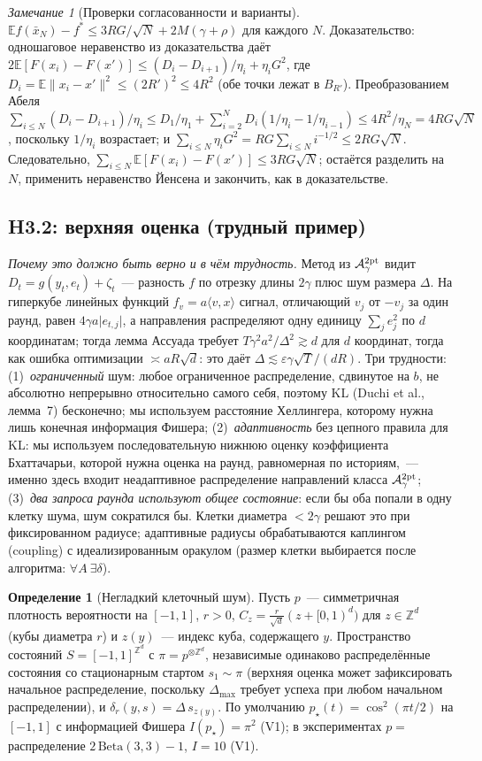 \documentclass[11pt,a4paper]{article}
\numberwithin{equation}{section}
\theoremstyle{definition}
\newtheorem{definition}[theorem]{Определение}
\theoremstyle{remark}
\newtheorem{remark}[theorem]{Замечание}
\newcommand{\E}{\mathbb E}\newcommand{\R}{\mathbb R}\newcommand{\Z}{\mathbb Z}\let\Prob\relax\newcommand{\Prob}{\mathbb P}
\newcommand{\norm}[1]{\lVert #1\rVert}\newcommand{\abs}[1]{\lvert #1\rvert}\newcommand{\ip}[2]{\langle #1,#2\rangle}
\newcommand{\Dmax}{\Delta_{\max}}\newcommand{\Dcp}{\Delta_{\rm cp}}\newcommand{\Dlow}{\Delta_{\rm low}}
\begin{document}
\begin{remark}[Проверки согласованности и варианты]
$\E f(\bar x_N)-f^*\le3RG/\sqrt N+2M(\gamma+\rho)$ для каждого $N$. Доказательство: одношаговое неравенство из доказательства даёт $2\E[F(x_i)-F(x')]\le(D_i-D_{i+1})/\eta_i+\eta_iG^2$, где $D_i=\E\norm{x_i-x'}^2\le(2R')^2\le4R^2$ (обе точки лежат в $B_{R'}$). Преобразованием Абеля $\sum_{i\le N}(D_i-D_{i+1})/\eta_i\le D_1/\eta_1+\sum_{i=2}^ND_i(1/\eta_i-1/\eta_{i-1})\le4R^2/\eta_N=4RG\sqrt N$, поскольку $1/\eta_i$ возрастает; и $\sum_{i\le N}\eta_iG^2=RG\sum_{i\le N}i^{-1/2}\le2RG\sqrt N$. Следовательно, $\sum_{i\le N}\E[F(x_i)-F(x')]\le3RG\sqrt N$; остаётся разделить на $N$, применить неравенство Йенсена и закончить, как в доказательстве.
\end{remark}

\subsection{H3.2: верхняя оценка (трудный пример)}\label{sec:upper}
\emph{Почему это должно быть верно и в чём трудность.} Метод из $\mathcal A^{\rm 2pt}_\gamma$ видит $D_t=g(y_t,e_t)+\zeta_t$~--- разность $f$ по отрезку длины $2\gamma$ плюс шум размера $\Delta$. На гиперкубе линейных функций $f_v=a\ip vx$ сигнал, отличающий $v_j$ от $-v_j$ за один раунд, равен $4\gamma a\abs{e_{t,j}}$, а направления распределяют одну единицу $\sum_je_j^2$ по $d$ координатам; тогда лемма Ассуада требует $T\gamma^2a^2/\Delta^2\gtrsim d$ для $d$ координат, тогда как ошибка оптимизации $\asymp aR\sqrt d$: это даёт $\Delta\lesssim\varepsilon\gamma\sqrt T/(dR)$. Три трудности: (1)~\emph{ограниченный} шум: любое ограниченное распределение, сдвинутое на $b$, не абсолютно непрерывно относительно самого себя, поэтому KL (Duchi et al., лемма~7) бесконечно; мы используем расстояние Хеллингера, которому нужна лишь конечная информация Фишера; (2)~\emph{адаптивность} без цепного правила для KL: мы используем последовательную нижнюю оценку коэффициента Бхаттачарьи, которой нужна оценка на раунд, равномерная по историям,~--- именно здесь входит неадаптивное распределение направлений класса $\mathcal A^{\rm 2pt}_\gamma$; (3)~\emph{два запроса раунда используют общее состояние}: если бы оба попали в одну клетку шума, шум сократился бы. Клетки диаметра $<2\gamma$ решают это при фиксированном радиусе; адаптивные радиусы обрабатываются каплингом (coupling) с идеализированным оракулом (размер клетки выбирается после алгоритма: $\forall A\ \exists\delta$).

\begin{definition}[Негладкий клеточный шум]\label{def:noise}
Пусть $p$~--- симметричная плотность вероятности на $[-1,1]$, $r>0$, $C_z=\frac r{\sqrt d}(z+[0,1)^d)$ для $z\in\Z^d$ (кубы диаметра $r$) и $z(y)$~--- индекс куба, содержащего $y$. Пространство состояний $S=[-1,1]^{\Z^d}$ с $\pi=p^{\otimes\Z^d}$, независимые одинаково распределённые состояния со стационарным стартом $s_1\sim\pi$ (верхняя оценка может зафиксировать начальное распределение, поскольку $\Dmax$ требует успеха при любом начальном распределении), и $\delta_r(y,s)=\Delta\,s_{z(y)}$. По умолчанию $p_\star(t)=\cos^2(\pi t/2)$ на $[-1,1]$ с информацией Фишера $I(p_\star)=\pi^2$ (V1); в экспериментах $p=$ распределение $2\,\mathrm{Beta}(3,3)-1$, $I=10$ (V1).
\end{definition}
\end{document}
